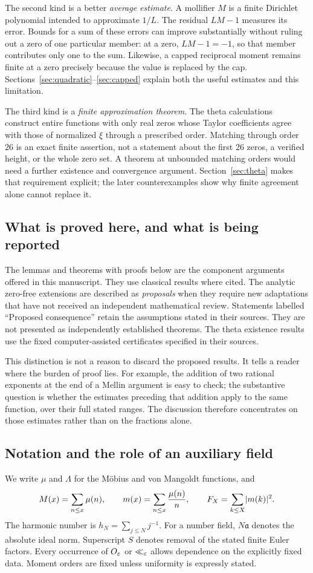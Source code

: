 The second kind is a better \emph{average estimate}. A mollifier $M$ is a finite Dirichlet polynomial intended to approximate $1/L$. The residual $LM-1$ measures its error. Bounds for a sum of these errors can improve substantially without ruling out a zero of one particular member: at a zero, $LM-1=-1$, so that member contributes only one to the sum. Likewise, a capped reciprocal moment remains finite at a zero precisely because the value is replaced by the cap. Sections~\ref{sec:quadratic}--\ref{sec:capped} explain both the useful estimates and this limitation.

The third kind is a \emph{finite approximation theorem}. The theta calculations construct entire functions with only real zeros whose Taylor coefficients agree with those of normalized $\xi$ through a prescribed order. Matching through order $26$ is an exact finite assertion, not a statement about the first $26$ zeros, a verified height, or the whole zero set. A theorem at unbounded matching orders would need a further existence and convergence argument. Section~\ref{sec:theta} makes that requirement explicit; the later counterexamples show why finite agreement alone cannot replace it.

\subsection{What is proved here, and what is being reported}

The lemmas and theorems with proofs below are the component arguments offered in this manuscript. They use classical results where cited. The analytic zero-free extensions are described as \emph{proposals} when they require new adaptations that have not received an independent mathematical review. Statements labelled ``Proposed consequence'' retain the assumptions stated in their sources. They are not presented as independently established theorems. The theta existence results use the fixed computer-assisted certificates specified in their sources.

This distinction is not a reason to discard the proposed results. It tells a reader where the burden of proof lies. For example, the addition of two rational exponents at the end of a Mellin argument is easy to check; the substantive question is whether the estimates preceding that addition apply to the same function, over their full stated ranges. The discussion therefore concentrates on those estimates rather than on the fractions alone.

\subsection{Notation and the role of an auxiliary field}
We write $\mu$ and $\Lambda$ for the M\"obius and von Mangoldt functions, and
\[
 M(x)=\sum_{n\le x}\mu(n),\qquad
 m(x)=\sum_{n\le x}\frac{\mu(n)}n,\qquad
 F_X=\sum_{k\le X}\lvert m(k)\rvert^2.
\]
The harmonic number is $h_N=\sum_{j\le N}j^{-1}$. For a number field, $N\mathfrak a$ denotes the absolute ideal norm. Superscript $S$ denotes removal of the stated finite Euler factors. Every occurrence of $O_\varepsilon$ or $\ll_\varepsilon$ allows dependence on the explicitly fixed data. Moment orders are fixed unless uniformity is expressly stated.

